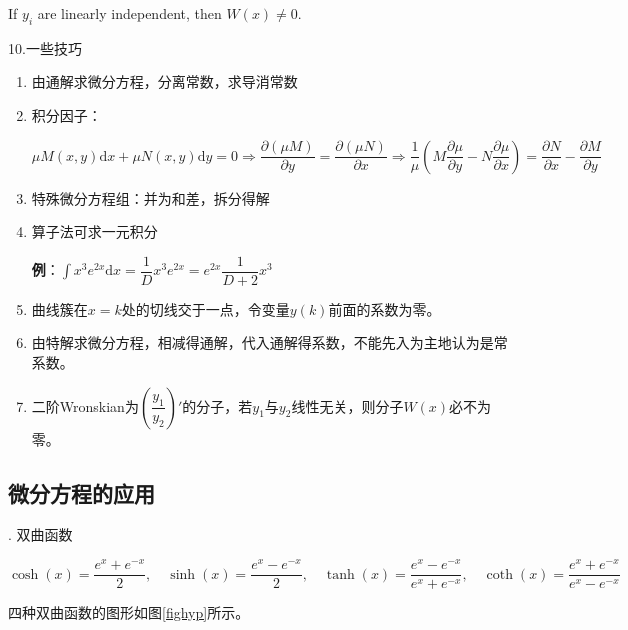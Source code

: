 \documentclass[UTF8]{ctexart}
\numberwithin{equation}{section}
\numberwithin{figure}{section}
\numberwithin{table}{section}
\newcommand\dif{\mathrm{d}}
\newcommand\no{\noindent}
\newcommand\dis{\displaystyle}
\newcommand\intd{\dis\int}
\begin{document}
\begin{spacing}{2}
If $y_i$ are  linearly independent, then $W(x)\neq0$.

\no10.一些技巧

\begin{enumerate}[itemindent=1.4em, label=(\arabic*)]

\item 由通解求微分方程，分离常数，求导消常数

\item 积分因子：

$\mu M(x,y)\dif x+\mu N(x,y)\dif y=0\Longrightarrow
\dfrac{\partial(\mu M)}{\partial y}=\dfrac{\partial(\mu N)}{\partial x}\Longrightarrow
\dfrac{1}{\mu}\left(M\dfrac{\partial \mu}{\partial y}-
N\dfrac{\partial\mu}{\partial x}\right)=\dfrac{\partial N}{\partial x}-
\dfrac{\partial M}{\partial y}$

\item 特殊微分方程组：并为和差，拆分得解

\item 算子法可求一元积分

\textbf{例}：$\intd x^3e^{2x}\dif x=\dfrac{1}{D}x^3e^{2x}=e^{2x}\dfrac{1}{D+2}x^3$

\item 曲线簇在$x=k$处的切线交于一点，令变量$y(k)$前面的系数为零。

\item 由特解求微分方程，相减得通解，代入通解得系数，不能先入为主地认为是常系数。

\item 二阶Wronskian为$\left(\dfrac{y_1}{y_2}\right)'$的分子，若$y_1$与$y_2$线性无关，则分子$W(x)$必不为零。

\end{enumerate}

\subsection{微分方程的应用}

\no1. 双曲函数

$\cosh(x)=\dfrac{e^x+e^{-x}}{2},\quad\sinh(x)=\dfrac{e^x-e^{-x}}{2},
\quad \tanh(x)=\dfrac{e^x-e^{-x}}{e^x+e^{-x}},
\quad \coth(x)=\dfrac{e^x+e^{-x}}{e^x-e^{-x}}$

四种双曲函数的图形如图\ref{fighyp}所示。


\end{spacing}
\end{document}
